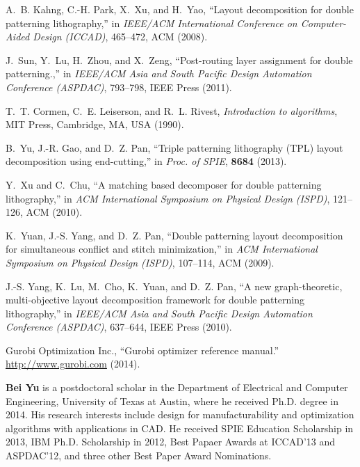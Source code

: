 \documentclass[12pt]{spieman}
\theoremstyle{plain}
\begin{document}
\begin{spacing}{1}
\begin{thebibliography}{10}
A.~B. Kahng, C.-H. Park, X.~Xu, and H.~Yao, ``Layout decomposition for double
  patterning lithography,'' in {\em IEEE/ACM International Conference on
  Computer-Aided Design (ICCAD)},  465--472, ACM  (2008).

J.~Sun, Y.~Lu, H.~Zhou, and X.~Zeng, ``Post-routing layer assignment for double
  patterning.,'' in {\em IEEE/ACM Asia and South Pacific Design Automation
  Conference (ASPDAC)},  793--798, IEEE Press  (2011).

T.~T. Cormen, C.~E. Leiserson, and R.~L. Rivest, {\em Introduction to
  algorithms}, MIT Press, Cambridge, MA, USA  (1990).

B.~Yu, J.-R. Gao, and D.~Z. Pan, ``Triple patterning lithography ({TPL}) layout
  decomposition using end-cutting,'' in {\em Proc. of SPIE},   {\bf 8684}
  (2013).

Y.~Xu and C.~Chu, ``A matching based decomposer for double patterning
  lithography,'' in {\em ACM International Symposium on Physical Design
  (ISPD)},  121--126, ACM  (2010).

K.~Yuan, J.-S. Yang, and D.~Z. Pan, ``Double patterning layout decomposition
  for simultaneous conflict and stitch minimization,'' in {\em ACM
  International Symposium on Physical Design (ISPD)},  107--114, ACM  (2009).

J.-S. Yang, K.~Lu, M.~Cho, K.~Yuan, and D.~Z. Pan, ``A new graph-theoretic,
  multi-objective layout decomposition framework for double patterning
  lithography,'' in {\em IEEE/ACM Asia and South Pacific Design Automation
  Conference (ASPDAC)},  637--644, IEEE Press  (2010).

{Gurobi Optimization Inc.}, ``Gurobi optimizer reference manual.''
  \url{http://www.gurobi.com}  (2014).

\end{thebibliography}




\iffalse
\clearpage
\vspace{2ex}\noindent
{\bf Bei Yu}
is a postdoctoral scholar in the Department of Electrical and Computer Engineering, University of Texas at Austin,
where he received Ph.D. degree in 2014.
His research interests include design for manufacturability and optimization algorithms with applications in CAD.
He received SPIE Education Scholarship in 2013, IBM Ph.D. Scholarship in 2012,
Best Papaer Awards at ICCAD'13 and ASPDAC'12, and three other Best Paper Award Nominations.



\end{spacing}
\end{document}
